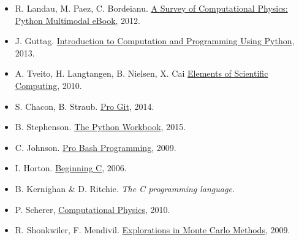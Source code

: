 \documentclass[letterpaper,10pt,onecolumn]{article}
\begin{document}
\begin{itemize}
\item  R. Landau, M. Paez, C. Bordeianu. \href{http://www.compadre.org/psrc/items/detail.cfm?ID=11578}{A Survey of Computational Physics: Python Multimodal eBook}, 2012.
\item  J. Guttag. \href{http://mitpress.mit.edu/books/introduction-computation-and-programming-using-python-0}{Introduction to Computation and Programming Using Python}, 2013.
\item  A. Tveito, H. Langtangen, B. Nielsen, X. Cai  \href{http://link.springer.com.ezproxy.uniandes.edu.co:8080/book/10.1007\%2F978-3-642-11299-7}{Elements of Scientific Computing}, 2010.
\item S. Chacon, B. Straub. \href{http://link.springer.com.ezproxy.uniandes.edu.co:8080/book/10.1007\%2F978-1-4302-1834-0}{Pro Git}, 2014.
\item B. Stephenson. \href{http://link.springer.com.ezproxy.uniandes.edu.co:8080/book/10.1007\%2F978-3-319-14240-1}{The Python Workbook}, 2015.
\item C. Johnson. \href{http://link.springer.com.ezproxy.uniandes.edu.co:8080/book/10.1007\%2F978-1-4302-1998-9}{Pro Bash Programming}, 2009.
\item I. Horton. \href{http://link.springer.com.ezproxy.uniandes.edu.co:8080/book/10.1007\%2F978-1-4302-0243-1}{Beginning C}, 2006.
\item B. Kernighan \& D. Ritchie. \textit{The C programming language.}
\item P. Scherer, \href{http://link.springer.com.ezproxy.uniandes.edu.co:8080/book/10.1007\%2F978-3-642-13990-1}{Computational Physics}, 2010.
\item R. Shonkwiler, F. Mendivil.  \href{http://link.springer.com.ezproxy.uniandes.edu.co:8080/book/10.1007\%2F978-0-387-87837-9}{Explorations in Monte Carlo Methods}, 2009.
\end{itemize}

\end{document}
